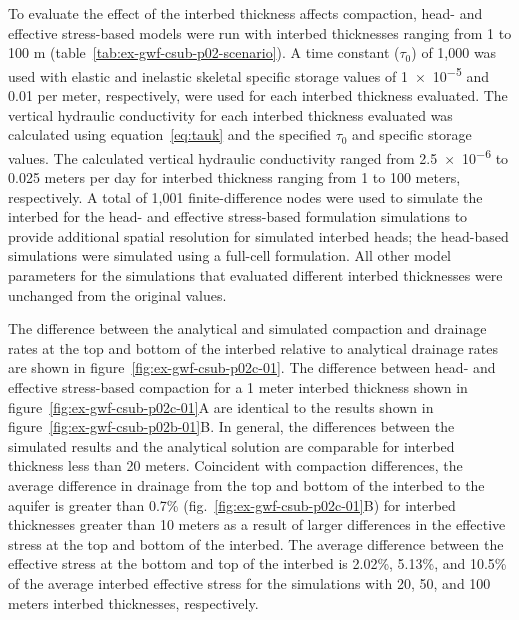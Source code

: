 To evaluate the effect of the interbed thickness affects compaction, head- and effective stress-based models were run with interbed thicknesses ranging from 1 to 100 m (table~\ref{tab:ex-gwf-csub-p02-scenario}).  A time constant ($\tau_0$) of 1,000 was used with elastic and inelastic skeletal specific storage values of \num{1e-5} and 0.01 per meter, respectively, were used for each interbed thickness evaluated. The vertical hydraulic conductivity for each interbed thickness evaluated was calculated using equation~\ref{eq:tauk} and the specified $\tau_0$ and specific storage values. The calculated vertical hydraulic conductivity ranged from \num{2.5e-6} to 0.025 meters per day for interbed thickness ranging from 1 to 100 meters, respectively. A total of 1,001 finite-difference nodes were used to simulate the interbed for the head- and effective stress-based formulation simulations to provide additional spatial resolution for simulated interbed heads; the head-based simulations were simulated using a full-cell formulation. All other model parameters for the simulations that evaluated different interbed thicknesses were unchanged from the original values.

The difference between the analytical and simulated compaction and drainage rates at the top and bottom of the interbed relative to analytical drainage rates are shown in figure~\ref{fig:ex-gwf-csub-p02c-01}. The difference between head- and effective stress-based compaction for a 1 meter interbed thickness shown in figure~\ref{fig:ex-gwf-csub-p02c-01}A are identical to the results shown in figure~\ref{fig:ex-gwf-csub-p02b-01}B. In general, the differences between the simulated results and the analytical solution are comparable for interbed thickness less than 20 meters. Coincident with compaction differences, the average difference in drainage from the top and bottom of the interbed to the aquifer is greater than 0.7\%  (fig.~\ref{fig:ex-gwf-csub-p02c-01}B) for interbed thicknesses greater than 10 meters as a result of larger differences in the effective stress at the top and bottom of the interbed. The average difference between the effective stress at the bottom and top of the interbed is 2.02\%, 5.13\%, and 10.5\% of the average interbed effective stress for the simulations with 20, 50, and 100 meters interbed thicknesses, respectively.

